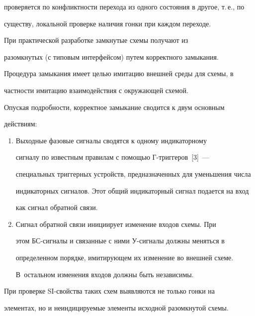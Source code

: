 проверяется по конфликтности перехода из одного состояния в другое, т.\,е., по 


существу, локальной проверке наличия гонки при каждом переходе.


      


      При практической разработке замкнутые схемы получают из 


разомкнутых (с типовым интерфейсом) путем корректного замыкания. 


Процедура замыкания имеет целью имитацию внешней среды для схемы, в 


частности имитацию взаимодействия с окружающей схемой.


      


      Опуская подробности, корректное замыкание сводится к двум основным 


действиям:


      \begin{enumerate}[1.]


      \item Выходные фазовые сигналы сводятся к одному индикаторному 


сигналу по известным правилам с помощью Г-триг\-ге\-ров~[3]~--- 


специальных триггерных устройств, предназначенных для уменьшения числа 


индикаторных сигналов. Этот общий индикаторный сигнал подается на вход 


как сигнал обратной связи.


      \item Сигнал обратной связи инициирует изменение входов схемы. При 


этом БС-сиг\-на\-лы и связанные с ними У-сиг\-на\-лы должны меняться в 


определенном порядке, имитирующем их изменение во внешней схеме. 


В~остальном изменения входов должны быть независимы.


      \end{enumerate}


      


      При проверке SI-свойства таких схем выявляются не только гонки на 


элементах, но и неиндицируемые элементы исходной разомкнутой схемы.


      


